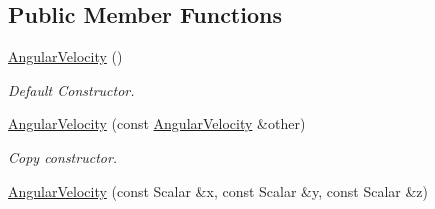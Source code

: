 \subsection*{Public Member Functions}
\begin{DoxyCompactItemize}
\item 
\hyperlink{classow__core_1_1AngularVelocity_a4646f848b302b5b4396f5b9a51ffbf8e}{Angular\+Velocity} ()\hypertarget{classow__core_1_1AngularVelocity_a4646f848b302b5b4396f5b9a51ffbf8e}{}\label{classow__core_1_1AngularVelocity_a4646f848b302b5b4396f5b9a51ffbf8e}

\begin{DoxyCompactList}\small\item\em Default Constructor. \end{DoxyCompactList}\item 
\hyperlink{classow__core_1_1AngularVelocity_a1dc9c5e4d74948ae3e485bbd639efad3}{Angular\+Velocity} (const \hyperlink{classow__core_1_1AngularVelocity}{Angular\+Velocity} \&other)\hypertarget{classow__core_1_1AngularVelocity_a1dc9c5e4d74948ae3e485bbd639efad3}{}\label{classow__core_1_1AngularVelocity_a1dc9c5e4d74948ae3e485bbd639efad3}

\begin{DoxyCompactList}\small\item\em Copy constructor. \end{DoxyCompactList}\item 
\hyperlink{classow__core_1_1AngularVelocity_ad30b2ef68b80c738d78e7898cb017412}{Angular\+Velocity} (const Scalar \&x, const Scalar \&y, const Scalar \&z)\hypertarget{classow__core_1_1AngularVelocity_ad30b2ef68b80c738d78e7898cb017412}{}\label{classow__core_1_1AngularVelocity_ad30b2ef68b80c738d78e7898cb017412}


\end{DoxyCompactItemize}
